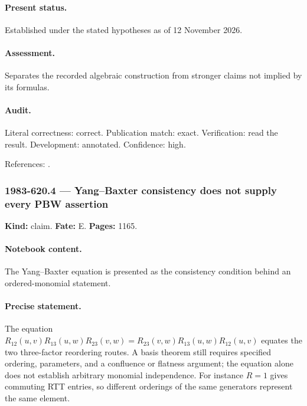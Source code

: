 \paragraph{Present status.} Established under the stated hypotheses as of 12 November 2026.

\paragraph{Assessment.} Separates the recorded algebraic construction from stronger claims not implied by its formulas.

\paragraph{Audit.} Literal correctness: correct. Publication match: exact. Verification: read the result. Development: annotated. Confidence: high.

\noindent References: \citep{sklyanin1982algebraic,cherednik1985finite}.\par

\subsubsection{1983-620.4 --- Yang–Baxter consistency does not supply every PBW assertion}

\label{item:1983-620.4}

\noindent\textbf{Kind:} claim. \textbf{Fate:} E. \textbf{Pages:} 1165.\par

\paragraph{Notebook content.} The Yang–Baxter equation is presented as the consistency condition behind an ordered-monomial statement.

\paragraph{Precise statement.} The equation \(R_{12}(u,v)R_{13}(u,w)R_{23}(v,w)=R_{23}(v,w)R_{13}(u,w)R_{12}(u,v)\) equates the two three-factor reordering routes. A basis theorem still requires specified ordering, parameters, and a confluence or flatness argument; the equation alone does not establish arbitrary monomial independence. For instance \(R=1\) gives commuting RTT entries, so different orderings of the same generators represent the same element.

